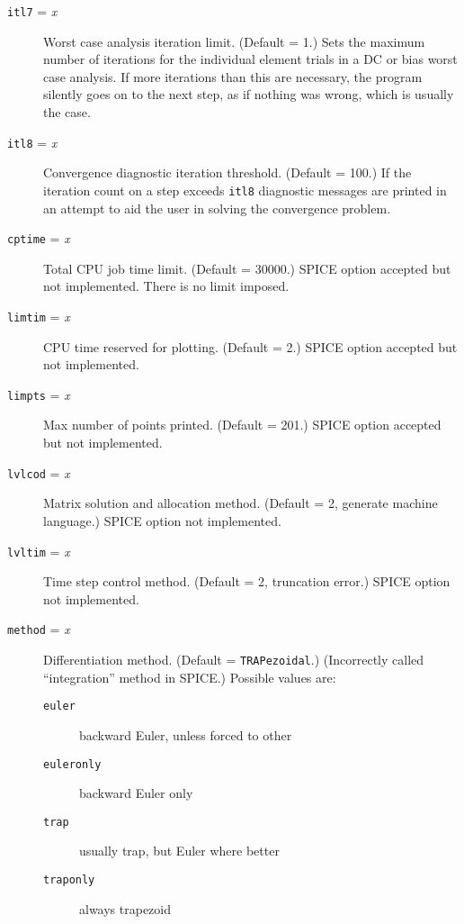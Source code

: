 \begin{description}
\item[{\tt itl7} = {\it x}] Worst case analysis iteration
limit.  (Default = 1.)
Sets the maximum number of iterations for the individual
element trials in a DC or bias worst case analysis.  If more
iterations than this are necessary, the program silently goes
on to the next step, as if nothing was wrong, which is usually
the case.

\item[{\tt itl8} = {\it x}] Convergence diagnostic iteration threshold.
(Default = 100.)  If the iteration count on a step exceeds {\tt itl8}
diagnostic messages are printed in an attempt to aid the user in solving the
convergence problem.

\item[{\tt cptime} = {\it x}] Total CPU job time limit.
(Default = 30000.)  SPICE option accepted but not implemented.
There is no limit imposed.

\item[{\tt limtim} = {\it x}] CPU time reserved for plotting.
(Default = 2.)  SPICE option accepted but not implemented.

\item[{\tt limpts} = {\it x}] Max number of points printed.
(Default = 201.)  SPICE option accepted but not implemented.

\item[{\tt lvlcod} = {\it x}] Matrix solution and allocation
method.  (Default = 2, generate machine language.)  SPICE
option not implemented.

\item[{\tt lvltim} = {\it x}] Time step control method.
(Default = 2, truncation error.)  SPICE option not implemented.

\item[{\tt method} = {\it x}]
Differentiation method.  (Default = {\tt TRAPezoidal}.)  (Incorrectly
called ``integration'' method in SPICE.) Possible values are:
\begin{description}
\item[{\tt euler}] backward Euler, unless forced to other
\item[{\tt euleronly}] backward Euler only
\item[{\tt trap}] usually trap, but Euler where better
\item[{\tt traponly}] always trapezoid
\end{description}


\end{description}
